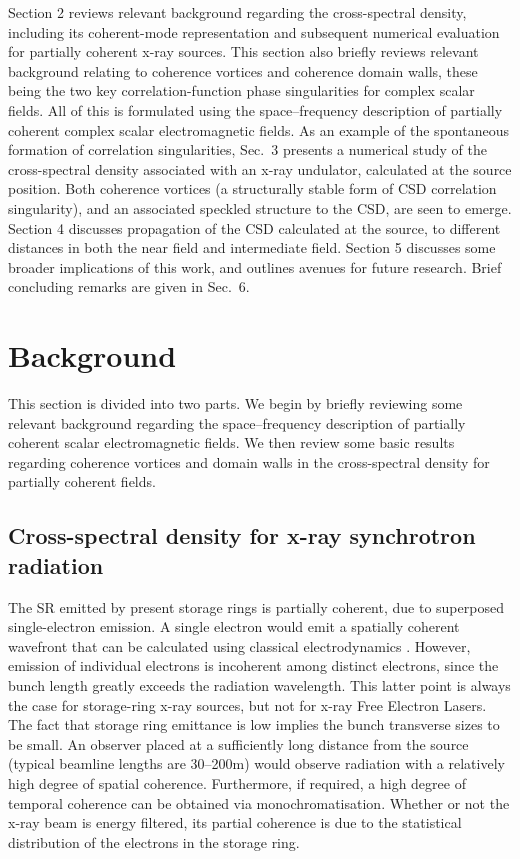 \documentclass[%
 reprint,
 amsmath,amssymb,
 aps,
]{revtex4-1}
\begin{document}
Section 2 reviews relevant background regarding the cross-spectral density, including its coherent-mode representation and subsequent numerical evaluation for partially coherent x-ray sources.  This section also briefly reviews relevant background relating to coherence vortices and coherence domain walls, these being the two key correlation-function phase singularities for complex scalar fields.  All of this is formulated using the space--frequency description of partially coherent complex scalar electromagnetic fields.  As an example of the spontaneous formation of correlation singularities, Sec.~3 presents a numerical study of the cross-spectral density associated with an x-ray undulator, calculated at the source position.  Both coherence vortices (a structurally stable form of CSD correlation singularity), and an associated speckled structure to the CSD, are seen to emerge. Section 4 discusses propagation of the CSD calculated at the source, to different distances in both the near field and intermediate field. Section 5 discusses some broader implications of this work, and outlines avenues for future research.  Brief concluding remarks are given in Sec.~6.

\section{Background}

This section is divided into two parts.  We begin by briefly reviewing some relevant background regarding the space--frequency description of partially coherent scalar electromagnetic fields.  We then review some basic results regarding coherence vortices and domain walls in the cross-spectral density for partially coherent fields.  
\subsection{Cross-spectral density for x-ray synchrotron radiation}

The SR emitted by present storage rings is partially coherent, due to superposed single-electron emission. A single electron would emit a spatially coherent wavefront that can be calculated using classical electrodynamics \cite{jackson}. However, emission of individual electrons is incoherent among distinct electrons, since the bunch length greatly exceeds the radiation wavelength.  This latter point is always the case for storage-ring x-ray sources, but not for x-ray Free Electron Lasers. The fact that storage ring emittance is low implies the bunch transverse sizes to be small. An observer placed at a sufficiently long distance from the source (typical beamline lengths are 30--200m) would observe  radiation with a relatively high degree of  spatial coherence. Furthermore, if required, a high degree of temporal coherence can be obtained via monochromatisation.  Whether or not the x-ray beam is energy filtered, its partial coherence is due to the statistical distribution of the electrons in the storage ring. 
\end{document}
